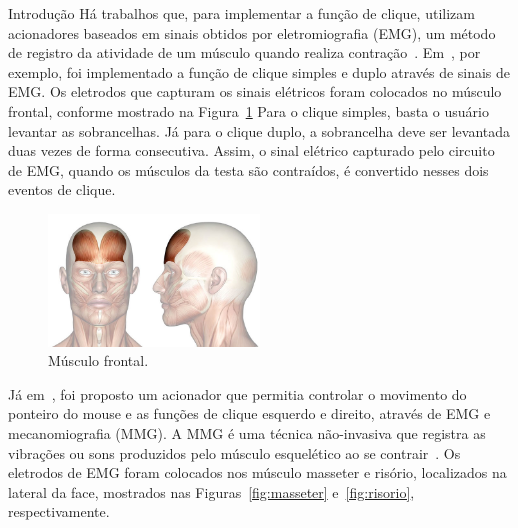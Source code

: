 \begin{chapter}{Introdução}
Há trabalhos que, para implementar a função de clique, utilizam acionadores
baseados em sinais obtidos por eletromiografia (EMG), um método de registro da
atividade de um músculo quando realiza contração~\cite{Amadio07}.
Em~\cite{Pinheiro12}, por exemplo, foi implementado a função de clique simples e
duplo através de sinais de EMG. Os eletrodos que capturam os sinais elétricos
foram colocados no músculo frontal, conforme mostrado na
Figura~\ref{fig:frontal} Para o clique simples, basta o usuário levantar as
sobrancelhas. Já para o clique duplo, a sobrancelha deve ser levantada duas
vezes de forma consecutiva. Assim, o sinal elétrico capturado pelo circuito de
EMG, quando os músculos da testa são contraídos, é convertido nesses dois
eventos de clique.
  
\begin{figure}[!h]
	\centering
	\includegraphics[width=0.5\textwidth]{fig/frontal}
	\caption{Músculo frontal.}
	\label{fig:frontal}
\end{figure}

Já em~\cite{Kaushik12}, foi proposto um acionador que permitia controlar o
movimento do ponteiro do mouse e as funções de clique esquerdo e direito,
através de EMG e mecanomiografia (MMG). A MMG é uma técnica não-invasiva que
registra as vibrações ou sons produzidos pelo músculo esquelético ao se
contrair~\cite{Vaz99}. Os eletrodos de EMG foram colocados nos músculo masseter
e risório, localizados na lateral da face, mostrados nas
Figuras~\ref{fig:masseter} e~\ref{fig:risorio}, respectivamente. 




\end{chapter}

